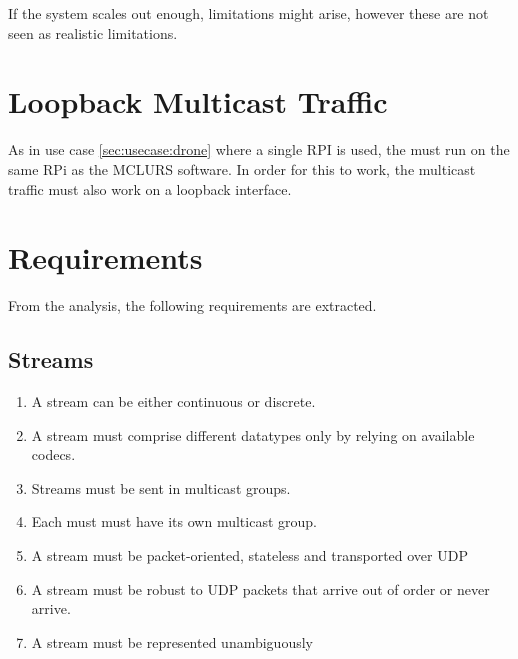 If the system scales out enough, limitations might arise, however these are not seen as realistic limitations. 

\section{Loopback Multicast Traffic} \label{sec:analysis:localmulticasttrafic}
As in use case \ref{sec:usecase:drone} where a single RPI is used, the  must run on the same RPi as the \ac{MCLURS} software. In order for this to work, the multicast traffic must also work on a loopback interface.  

\section{Requirements}
From the analysis, the following requirements are extracted.
\subsection{Streams}
\begin{enumerate}
	\item A stream can be either continuous or discrete.
	\item A stream must comprise different datatypes only by relying on available codecs.
    \item Streams must be sent in multicast groups.
    \item Each must must have its own multicast group.
	\item A stream must be packet-oriented, stateless and transported over UDP
	\item A stream must be robust to UDP packets that arrive out of order or never arrive.
	\item A stream must be represented unambiguously
\end{enumerate}
\todo{Table of requirements[Where it's defined][Where it's tested][Whether it passes}

